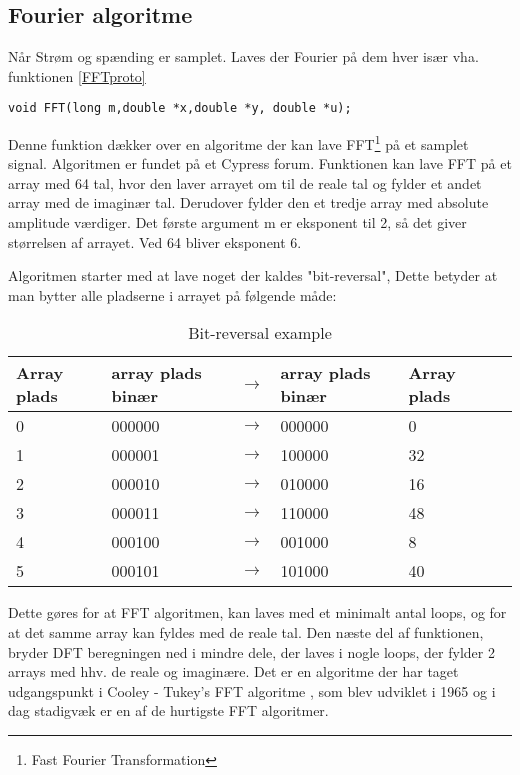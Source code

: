 
\subsection{Fourier algoritme}
Når Strøm og spænding er samplet. Laves der Fourier på dem hver især vha. funktionen \ref{FFTproto}

\begin{lstlisting}
void FFT(long m,double *x,double *y, double *u);
\end{lstlisting}

Denne funktion dækker over en algoritme der kan lave FFT\footnote{Fast Fourier Transformation} på et samplet signal. Algoritmen er fundet på et Cypress forum\cite{FFTalgo}. Funktionen kan lave FFT på et array med 64 tal, hvor den laver arrayet om til de reale tal og fylder et andet array med de imaginær tal. Derudover fylder den et tredje array med absolute amplitude værdiger. Det første argument m er eksponent til 2, så det giver størrelsen af arrayet. Ved 64 bliver eksponent 6.

Algoritmen starter med at lave noget der kaldes "bit-reversal", Dette betyder at man bytter alle pladserne i arrayet på følgende måde:

\begin{table}[H] 
	\centering 
	\begin{tabular}{|l|l|l|l|l|l|} %
		\hline 	%
		Array plads		&array plads binær & $\rightarrow$ 	&array plads binær    	&Array plads 	 \\ \hline 	%
		0		 	& 000000  				& $\rightarrow$ &000000				&0 	 \\ \hline 
		1		 	& 000001  				& $\rightarrow$ &100000				&32	 \\ \hline
		2		 	& 000010  				& $\rightarrow$ &010000				&16	 \\ \hline
		3		 	& 000011  				& $\rightarrow$ &110000				&48	 \\ \hline 
		4		 	& 000100  				& $\rightarrow$ &001000				&8	 \\ \hline 
		5		 	& 000101  				& $\rightarrow$ &101000				&40 \\ \hline   
	\end{tabular} 
	\caption{Bit-reversal example} 
	\label{tab:bit} 
\end{table}
Dette gøres for at FFT algoritmen, kan laves med et minimalt antal loops, og for at det samme array kan fyldes med de reale tal. Den næste del af funktionen, bryder DFT beregningen ned i mindre dele, der laves i nogle loops, der fylder 2 arrays med hhv. de reale og imaginære. Det er en algoritme der har taget udgangspunkt i Cooley - Tukey's FFT algoritme \cite{Cooley}, som blev udviklet i 1965 og i dag stadigvæk er en af de hurtigste FFT algoritmer.	  


